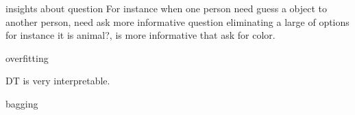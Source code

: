 \documentclass{beamer}
\begin{document}
\begin{frame}{insights about question}
For instance when one person need guess a object to another person, need ask more informative question eliminating a large of options for instance it is animal?, is more informative that ask for color.

\end{frame}

\begin{frame}{overfitting}






\end{frame}


\begin{frame}
DT is very interpretable. 
\end{frame}



\begin{frame}{bagging}


\end{frame}
\end{document}
